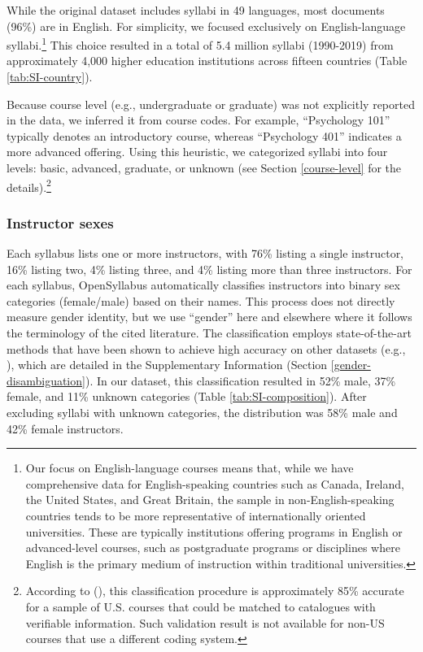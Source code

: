 \documentclass[
  british,
  12pt,
]{article}
\begin{document}
While the original dataset includes syllabi in 49 languages, most documents (96\%) are in English. For simplicity, we focused exclusively on English-language syllabi.\footnote{
  Our focus on English-language courses means that, while we have comprehensive data for English-speaking countries such as Canada, Ireland, the United States, and Great Britain, the sample in non-English-speaking countries tends to be more representative of internationally oriented universities. These are typically institutions offering programs in English or advanced-level courses, such as postgraduate programs or disciplines where English is the primary medium of instruction within traditional universities.} This choice resulted in a total of 5.4 million syllabi (1990-2019) from approximately 4,000 higher education institutions across fifteen countries (Table \ref{tab:SI-country}).

Because course level (e.g., undergraduate or graduate) was not explicitly reported in the data, we inferred it from course codes. For example, ``Psychology 101'' typically denotes an introductory course, whereas ``Psychology 401'' indicates a more advanced offering. Using this heuristic, we categorized syllabi into four levels: basic, advanced, graduate, or unknown (see Section \ref{course-level} for the details).\footnote{
  According to (), this classification procedure is approximately 85\% accurate for a sample of U.S. courses that could be matched to catalogues with verifiable information. Such validation result is not available for non-US courses that use a different coding system.}

\subsubsection{Instructor sexes}\label{instructor-sexes}

Each syllabus lists one or more instructors, with 76\% listing a single instructor, 16\% listing two, 4\% listing three, and 4\% listing more than three instructors. For each syllabus, OpenSyllabus automatically classifies instructors into binary sex categories (female/male) based on their names. This process does not directly measure gender identity, but we use ``gender'' here and elsewhere where it follows the terminology of the cited literature. The classification employs state-of-the-art methods that have been shown to achieve high accuracy on other datasets (e.g., ), which are detailed in the Supplementary Information (Section \ref{gender-disambiguation}). In our dataset, this classification resulted in 52\% male, 37\% female, and 11\% unknown categories (Table \ref{tab:SI-composition}). After excluding syllabi with unknown categories, the distribution was 58\% male and 42\% female instructors.
\end{document}
